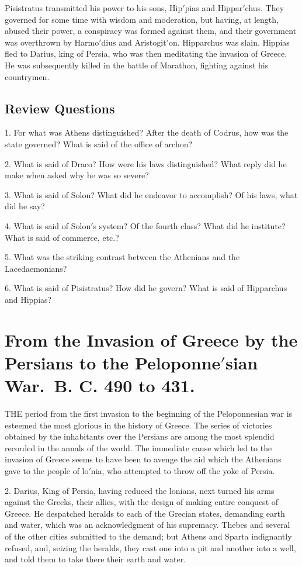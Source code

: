 \documentclass[openany,a4paper]{memoir}
\begin{document}
Pisistratus transmitted his power to his sons, Hip$'$pias 
and Hippar$'$chus. They governed for some time with wisdom 
and moderation, but having, at length, abused their power, a 
conspiracy was formed against them, and their government 
was overthrown by Harmo$'$dius and Aristogit$'$on. Hipparchus was slain. Hippias fled to Darius, king of Persia, 
who was then meditating the invasion of Greece. He was 
subsequently killed in the battle of Marathon, fighting against 
his countrymen. 

\section{Review Questions}


1. For what was Athens distinguished? After the 
death of Codrus, how was the state governed? What is said of the 
office of archon? 

2. What is said of Draco? How were his laws distinguished? What reply did he make when asked why he was so severe? 

3. What is said of Solon? What did he endeavor to accomplish? 
Of his laws, what did he say? 

4. What is said of Solon$'$s system? Of 
the fourth class? What did he institute? What is said of commerce, 
etc.?

5. What was the striking contrast between the Athenians and the 
Lacedaemonians? 

6. What is said of Pisistratus? How did he govern? What is said 
of Hipparchus and Hippias? 



\chapter{From the Invasion of Greece by the Persians to the Peloponne$'$sian War.~B. C. 490 to 431.} 

THE period from the first invasion to the beginning of the 
Peloponnesian war is esteemed the most glorious in the 
history of Greece. The series of victories obtained by the 
inhabitants over the Persians are among the most splendid 
recorded in the annals of the world. The immediate cause 
which led to the invasion of Greece seems to have been to 
avenge the aid which the Athenians gave to the people of 
lo$'$nia, who attempted to throw off the yoke of Persia. 

2. Darius, King of Persia, having reduced the lonians, next 
turned his arms against the Greeks, their allies, with the design 
of making entire conquest of Greece. He despatched heralds 
to each of the Grecian states, demanding earth and water, 
which was an acknowledgment of his supremacy. Thebes 
and several of the other cities submitted to the demand; but 
Athens and Sparta indignantly refused, and, seizing the 
heralds, they cast one into a pit and another into a well, and 
told them to take there their earth and water. 
\end{document}
